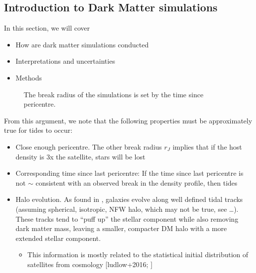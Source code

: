 \subsection{Introduction to Dark Matter
simulations}\label{introduction-to-dark-matter-simulations}

In this section, we will cover

\begin{itemize}
\tightlist
\item
  How are dark matter simulations conducted
\item
  Interpretations and uncertainties
\item
  Methods
\end{itemize}

\begin{figure}
\centering
{}
\caption[Break radius validation]{The break radius of the simulations is
set by the time since pericentre.}\label{fig:idealized_break_radius}
\end{figure}

From this argument, we note that the following properties must be
approximately true for tides to occur:

\begin{itemize}
\tightlist
\item
  Close enough pericentre. The other break radius \(r_J\) implies that
  if the host density is 3x the satellite, stars will be lost
\item
  Corresponding time since last pericentre: If the time since last
  pericentre is not \(\sim\) consistent with an observed break in the
  density profile, then tides
\item
  Halo evolution. As found in \citet{EN2021}, galaxies evolve along well
  defined tidal tracks (assuming spherical, isotropic, NFW halo, which
  may not be true, see \ldots). These tracks tend to ``puff up'' the
  stellar component while also removing dark matter mass, leaving a
  smaller, compacter DM halo with a more extended stellar component.

  \begin{itemize}
  \tightlist
  \item
    This information is mostly related to the statistical initial
    distribution of satellites from cosmology {[}ludlow+2016;
    \citet{fattahi+2018}{]}
  \end{itemize}
\end{itemize}

